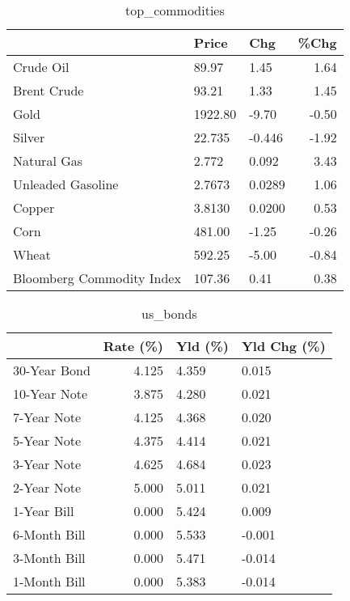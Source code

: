 \documentclass{article}%
\begin{document}
\begin{table}[htbp]%
\caption{top\_commodities}%
\centering%
\begin{adjustbox}{width=1\textwidth}%
\begin{tabular}{lllr}
\toprule
                          &   Price &    Chg &  \%Chg \\
\midrule
               Crude Oil  &   89.97 &   1.45 &  1.64 \\
             Brent Crude  &   93.21 &   1.33 &  1.45 \\
                    Gold  & 1922.80 &  -9.70 & -0.50 \\
                  Silver  &  22.735 & -0.446 & -1.92 \\
             Natural Gas  &   2.772 &  0.092 &  3.43 \\
       Unleaded Gasoline  &  2.7673 & 0.0289 &  1.06 \\
                  Copper  &  3.8130 & 0.0200 &  0.53 \\
                    Corn  &  481.00 &  -1.25 & -0.26 \\
                   Wheat  &  592.25 &  -5.00 & -0.84 \\
Bloomberg Commodity Index &  107.36 &   0.41 &  0.38 \\
\bottomrule
\end{tabular}
%
\end{adjustbox}%
\end{table}

%


\begin{table}[htbp]%
\caption{us\_bonds}%
\centering%
\begin{adjustbox}{width=1\textwidth}%
\begin{tabular}{lrll}
\toprule
             &  Rate (\%) & Yld (\%) & Yld Chg (\%) \\
\midrule
30-Year Bond &     4.125 &   4.359 &       0.015 \\
10-Year Note &     3.875 &   4.280 &       0.021 \\
 7-Year Note &     4.125 &   4.368 &       0.020 \\
 5-Year Note &     4.375 &   4.414 &       0.021 \\
 3-Year Note &     4.625 &   4.684 &       0.023 \\
 2-Year Note &     5.000 &   5.011 &       0.021 \\
 1-Year Bill &     0.000 &   5.424 &       0.009 \\
6-Month Bill &     0.000 &   5.533 &      -0.001 \\
3-Month Bill &     0.000 &   5.471 &      -0.014 \\
1-Month Bill &     0.000 &   5.383 &      -0.014 \\
\bottomrule
\end{tabular}
%
\end{adjustbox}%
\end{table}
\end{document}
